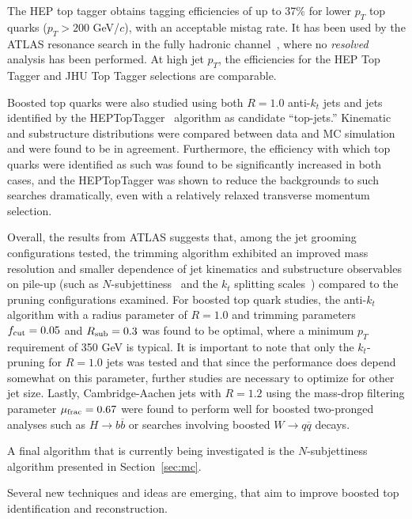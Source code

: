 The HEP top tagger obtains tagging efficiencies of up to 37\% for lower 
$p_T$ top quarks ($p_T > 200$ GeV/$c$), with an acceptable mistag rate.  
It has been used by the ATLAS \ttbar{} resonance search in the fully
hadronic channel~\cite{Aad:2012raa}, where no {\it resolved} analysis
has been performed. At high jet $p_T$, the efficiencies for the HEP Top 
Tagger and JHU Top Tagger selections are comparable.

Boosted top quarks were also studied using both $R=1.0$ anti-$k_{t}$ jets 
and jets identified by the HEPTopTagger~\cite{Plehn:2010st} algorithm 
as candidate ``top-jets.'' Kinematic and substructure distributions were 
compared between data and MC simulation and were found to be in agreement. 
Furthermore, the efficiency with which top quarks were identified as such 
was found to be significantly increased in both cases, and the HEPTopTagger 
was shown to reduce the backgrounds to such searches dramatically, even 
with a relatively relaxed transverse momentum selection.

Overall, the results from ATLAS suggests that, among the jet grooming 
configurations tested, the trimming algorithm exhibited an improved mass 
resolution and smaller dependence of jet kinematics and substructure 
observables on pile-up (such as 
$N$-subjettiness~\cite{Thaler:2010tr,Thaler:2011gf} and the 
$k_{t}$ splitting scales~\cite{Butterworth:2002tt}) compared to the 
pruning configurations examined. For boosted top quark studies, 
the anti-$k_{t}$ algorithm with a radius parameter of $R=1.0$ and 
trimming parameters $f_{\rm cut}=0.05$ and $R_{\rm sub}=0.3$ was found to 
be optimal, where a minimum $p_{T}$ requirement of 350 GeV is typical. It 
is important to note that only the $k_{t}$-pruning for $R=1.0$ jets was 
tested and that since the performance does depend somewhat on this 
parameter, further studies are necessary to optimize for other jet size. 
Lastly, Cambridge-Aachen jets with $R=1.2$ using the mass-drop filtering 
parameter $\mu_{\rm frac}=0.67$ were found to perform well for 
boosted two-pronged analyses such as $H\rightarrow b\overline{b}$ or 
searches involving boosted $W\rightarrow q\overline{q}$ decays.

A final algorithm that is currently being investigated is the $N$-subjettiness 
algorithm \cite{Thaler:2010tr} presented in Section~\ref{sec:mc}. 


Several new techniques and ideas are emerging, that aim to improve 
boosted top identification and reconstruction.

